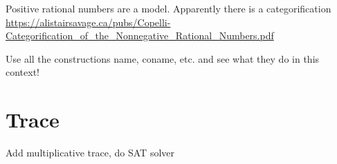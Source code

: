 \documentclass[sigplan,10pt,review,anonymous]{acmart}
\begin{document}
Positive rational numbers are a model. Apparently there is a
categorification
\url{https://alistairsavage.ca/pubs/Copelli-Categorification_of_the_Nonnegative_Rational_Numbers.pdf}

Use all the constructions name, coname, etc. and see what they do in this context!

\section{Trace}
  
Add multiplicative trace, do SAT solver


\end{document}
